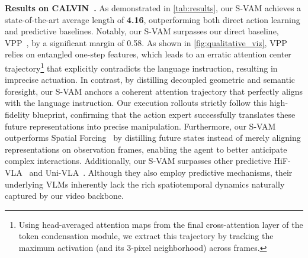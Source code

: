 \documentclass[runningheads]{llncs}
\begin{document}
\noindent \textbf{Results on CALVIN~\cite{mees2022calvin}.} 
As demonstrated in \cref{tab:results}, our S-VAM achieves a state-of-the-art average length of \textbf{4.16}, outperforming both direct action learning and predictive baselines. Notably, our S-VAM surpasses our direct baseline, VPP~\cite{huvideo}, by a significant margin of 0.58. As shown in \cref{fig:qualitative_viz}, VPP~\cite{huvideo} relies on entangled one-step features, which leads to an erratic attention center trajectory\footnote{Using head-averaged attention maps from the final cross-attention layer of the token condensation module, we extract this trajectory by tracking the maximum activation (and its 3-pixel neighborhood) across frames.} that explicitly contradicts the language instruction, resulting in imprecise actuation. In contrast, by distilling decoupled geometric and semantic foresight, our S-VAM anchors a coherent attention trajectory that perfectly aligns with the language instruction. Our execution rollouts strictly follow this high-fidelity blueprint, confirming that the action expert successfully translates these future representations into precise manipulation. Furthermore, our S-VAM outperforms Spatial Forcing~\cite{li2025spatial} by distilling future states instead of merely aligning representations on observation frames, enabling the agent to better anticipate complex interactions. Additionally, our S-VAM surpasses other predictive HiF-VLA~\cite{lin2025hif} and Uni-VLA~\cite{wang2025unified}. Although they also employ predictive mechanisms, their underlying VLMs inherently lack the rich spatiotemporal dynamics naturally captured by our video backbone.
\end{document}
